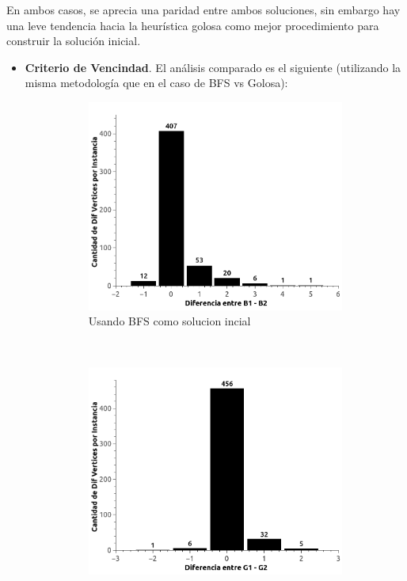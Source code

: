 En ambos casos, se aprecia una paridad entre ambos soluciones, sin embargo hay una leve tendencia hacia la heurística golosa como mejor procedimiento para construir la solución inicial.

\begin{itemize}
	\item \textbf{Criterio de Vencindad}. El análisis comparado es el siguiente (utilizando la misma metodología que en el caso de BFS vs Golosa):

    \begin{figure}[H]
        \centering
        \begin{subfigure}[b]{0.5\textwidth}
                \includegraphics[width=\textwidth]{imagenes/ejer4-B1vsB2.jpg}
                \caption{Usando BFS como solucion incial}
        \end{subfigure}%
        ~ %
        \begin{subfigure}[b]{0.5\textwidth}
                \includegraphics[width=\textwidth]{imagenes/ejer4-G1vsG2.jpg}

\end{subfigure}
\end{figure}
\end{itemize}
